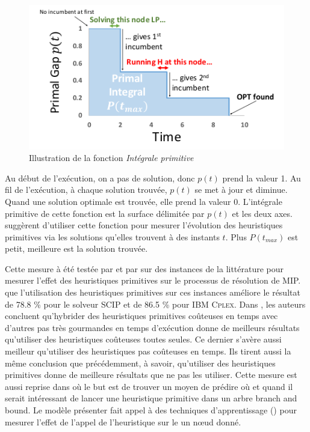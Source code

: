 \documentclass[12pt,a4paper,oneside]{book}
\theoremstyle{definition}
\begin{document}
	\begin{figure}[H]
		\centering
		\includegraphics[width=0.7\linewidth]{primal_integral}
		\caption{Illustration de la fonction \textit{Intégrale primitive}}
		\label{fig:primalintegral}
	\end{figure}
	Au début de l'exécution, on a pas de solution, donc $p(t)$ prend la valeur 1. Au fil de l'exécution, à chaque solution trouvée, $p(t)$ se met à jour et diminue. Quand une solution optimale est trouvée, elle prend la valeur 0. L'intégrale primitive de cette fonction est la surface délimitée par $p(t)$ et les deux axes. \cite{Achterberg2012} suggèrent d'utiliser cette fonction pour mesurer l'évolution des heuristiques primitives via les solutions qu'elles trouvent à des instants $t$. Plus $P(t_{max}) $ est petit, meilleure est la solution trouvée. 
	
	Cette mesure à été testée par \cite{Achterberg2012} et par \cite{Berthold2013} sur des instances de la littérature pour mesurer l'effet des heuristiques primitives sur le processus de résolution de MIP. \cite{Berthold2013} que l'utilisation des heuristiques primitives sur ces instances améliore le résultat de 78.8 \% pour le solveur SCIP et de 86.5 \% pour IBM \textsc{Cplex}. Dans \cite{Achterberg2012}, les auteurs concluent qu'hybrider des heuristiques primitives coûteuses en temps avec d'autres pas très gourmandes en temps d'exécution donne de meilleurs résultats qu'utiliser des heuristiques coûteuses toutes seules. Ce dernier s'avère aussi meilleur qu'utiliser des heuristiques pas coûteuses en temps. Ils tirent aussi la même conclusion que précédemment, à savoir, qu'utiliser des heuristiques primitives donne de meilleure résultats que ne pas les utiliser. Cette mesure est aussi reprise dans \cite{Khalil2017} où le but est de trouver un moyen de prédire où et quand il serait intéressant de lancer une heuristique primitive dans un arbre branch and bound. Le modèle présenter fait appel à des techniques d'apprentissage () pour mesurer l'effet de l'appel de l'heuristique sur le un nœud donné.
	     
\end{document}
